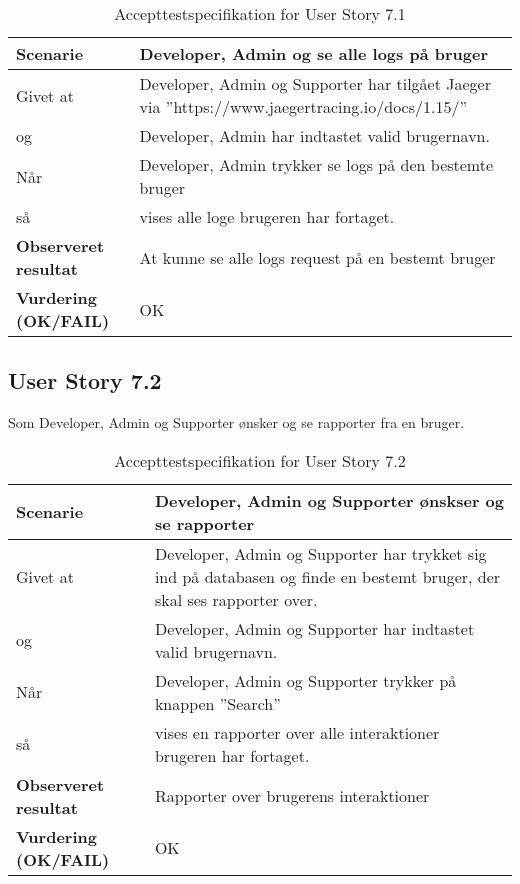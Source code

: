 \begin{table}[H]
	\centering
	\caption{Accepttestspecifikation for User Story 7.1}
	\begin{tabular}{p{6cm}|p{6cm}}
		\hline
		\textbf{Scenarie} & Developer, Admin og se alle logs på bruger\\[10px]
        \hline
        Givet at & Developer, Admin og Supporter har tilgået Jaeger  via ''https://www.jaegertracing.io/docs/1.15/''\\
        \hline
        og & Developer, Admin har indtastet valid brugernavn.\\
        \hline
        Når & Developer, Admin trykker se logs på den bestemte bruger\\
        \hline
        så & vises alle loge brugeren har fortaget.\\
		\hline
		\rowcolor{white}
		\textbf{Observeret resultat} & At kunne se alle logs request på en bestemt bruger\\
		\hline
		\textbf{Vurdering (OK/FAIL)} & OK\\
		\hline
	\end{tabular}
\end{table}

\subsection{User Story 7.2}
Som Developer, Admin og Supporter ønsker og se rapporter fra en bruger.

\begin{table}[H]
	\centering
	\caption{Accepttestspecifikation for User Story 7.2}
	\begin{tabular}{p{6cm}|p{6cm}}
		\hline
		\textbf{Scenarie} & Developer, Admin og Supporter  ønskser og se rapporter\\[10px]
        \hline
        Givet at & Developer, Admin og Supporter har trykket sig ind på databasen og  finde en bestemt bruger, der skal ses rapporter over.\\
        \hline
        og & Developer, Admin og Supporter har indtastet valid brugernavn.\\
        \hline
        Når & Developer, Admin og Supporter trykker på knappen ''Search''\\
        \hline
        så & vises en rapporter over alle interaktioner brugeren har fortaget.\\
		\hline
		\rowcolor{white}
		\textbf{Observeret resultat} & Rapporter over brugerens interaktioner \\
		\hline
		\textbf{Vurdering (OK/FAIL)} & OK\\
		\hline
	\end{tabular}
\end{table}




